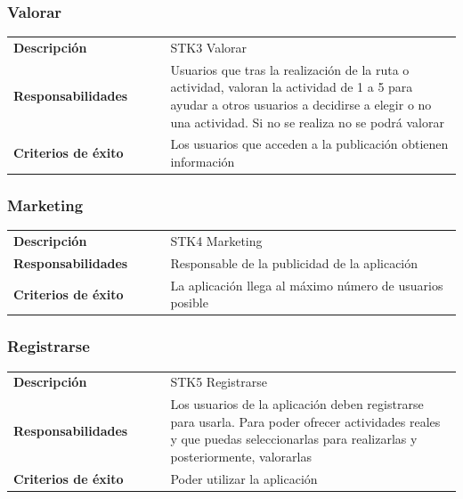 \documentclass[11pt]{article}
\begin{document}
\subsubsection{Valorar}
\begin{table}[H]
  \centering
  \begin{tabular}{p{0.35\linewidth}|p{0.65\linewidth}}
    \toprule
    \textbf{Descripción} & STK3 Valorar\\
    \textbf{Responsabilidades} & Usuarios que tras la realización de la ruta o actividad, valoran la actividad de 1 a 5 para ayudar a otros usuarios a decidirse a elegir o no una actividad. Si no se realiza no se podrá valorar\\
    \textbf{Criterios de éxito} & Los usuarios que acceden a la publicación obtienen información \\
    \bottomrule
  \end{tabular}
\end{table}

\subsubsection{Marketing}
\begin{table}[H]
  \centering
  \begin{tabular}{p{0.35\linewidth}|p{0.65\linewidth}}
    \toprule
    \textbf{Descripción} & STK4 Marketing\\
    \textbf{Responsabilidades} & Responsable de la publicidad de la aplicación\\
    \textbf{Criterios de éxito} &  La aplicación llega al máximo número de usuarios posible\\
    \bottomrule
  \end{tabular}
\end{table}

\subsubsection{Registrarse}
\begin{table}[H]
  \centering
  \begin{tabular}{p{0.35\linewidth}|p{0.65\linewidth}}
    \toprule
    \textbf{Descripción} & STK5 Registrarse\\
    \textbf{Responsabilidades} & Los usuarios de la aplicación deben registrarse para usarla. Para poder ofrecer actividades reales y que puedas seleccionarlas para realizarlas y posteriormente, valorarlas\\
    \textbf{Criterios de éxito} &  Poder utilizar la aplicación\\
    \bottomrule
  \end{tabular}
\end{table}
\end{document}
